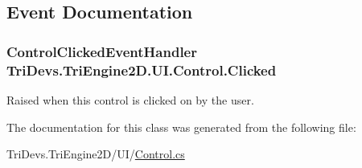 \subsection{Event Documentation}
\hypertarget{class_tri_devs_1_1_tri_engine2_d_1_1_u_i_1_1_control_aa1540c7b2b3439e037b4e6c0247086fc}{
\subsubsection[{Clicked}]{\setlength{\rightskip}{0pt plus 5cm}Control\-Clicked\-Event\-Handler Tri\-Devs.\-Tri\-Engine2\-D.\-U\-I.\-Control.\-Clicked}}\label{class_tri_devs_1_1_tri_engine2_d_1_1_u_i_1_1_control_aa1540c7b2b3439e037b4e6c0247086fc}


Raised when this control is clicked on by the user. 



The documentation for this class was generated from the following file\-:\begin{DoxyCompactItemize}
\item 
Tri\-Devs.\-Tri\-Engine2\-D/\-U\-I/\hyperlink{_control_8cs}{Control.\-cs}\end{DoxyCompactItemize}
